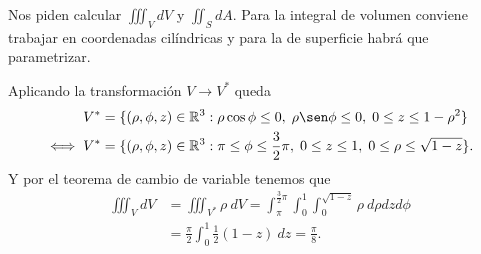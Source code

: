 \begin{solution}
    Nos piden calcular $\iiint_V dV$ y $\iint_S dA$. Para la
    integral de volumen conviene trabajar en coordenadas
    cil\'indricas y para la de superficie habr\'a que parametrizar.

    \begin{center}
      \end{center}

    Aplicando la transformaci\'on $V \rightarrow V^*$ queda
    \begin{align*}
        V^*      & =\{(\rho, \phi, z)\in\Rn{3}: \rho\cos\phi \leq 0,\;
        \rho\sen\phi \leq 0,\; 0 \leq z \leq 1-\rho^2\}               \\
        \iff V^* & =\{(\rho, \phi, z)\in\Rn{3}: \pi \leq \phi \leq
        \frac{3}{2}\pi,\; 0 \leq z \leq 1,\; 0 \leq \rho \leq
        \sqrt{1-z} \}.
    \end{align*}
    Y por el teorema de cambio de variable tenemos que
    \begin{align*}
        \iiint_V dV & = \iiint_{V^*} \rho\:dV = \int_\pi^{\frac{3}{2}\pi}
        \int_0^1\int_0^{\sqrt{1-z}}\rho\:d\rho dz d\phi                   \\
                    & =\frac{\pi}{2}\int_0^1\frac{1}{2}(1-z)\:dz =
        \frac{\pi}{8}.
    \end{align*}


\end{solution}
